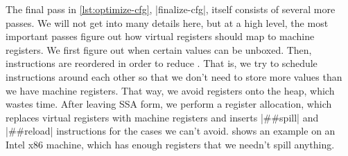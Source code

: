 
The final pass in \vref{lst:optimize-cfg}, \factor|finalize-cfg|, itself
consists of several more passes.  We will not get into many details here, but
at a high level, the most important passes figure out how virtual registers
should map to machine registers.  We first figure out when certain values can
be unboxed.  Then, instructions are reordered in order to reduce .  That is, we try to schedule instructions around each other so that
we don't need to store more values than we have machine registers.  That way,
we avoid  registers onto the heap, which wastes time.  After
leaving \gls{SSA} form, we perform a  register allocation,
which replaces virtual registers with machine registers and inserts
\factor|##spill| and \factor|##reload| instructions for the cases we can't
avoid.   shows an example on an Intel x86 machine, which
has enough registers that we needn't spill anything.
